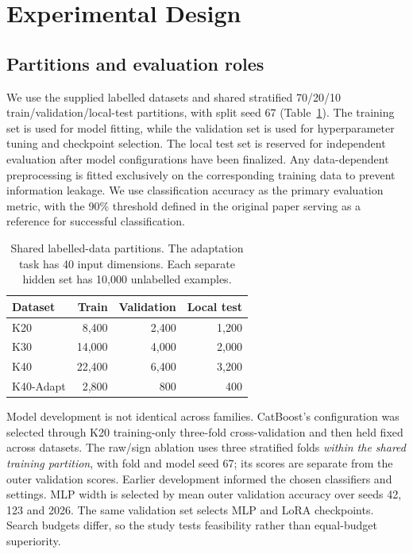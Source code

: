 \documentclass{article}
\begin{document}
\section{Experimental Design}
\subsection{Partitions and evaluation roles}
We use the supplied labelled datasets and shared stratified 70/20/10 train/validation/local-test partitions, with split seed 67 (Table~\ref{tab:data}). The training set is used for model fitting, while the validation set is used for hyperparameter tuning and checkpoint selection. The local test set is reserved for independent evaluation after model configurations have been finalized. Any data-dependent preprocessing is fitted exclusively on the corresponding training data to prevent information leakage. We use classification accuracy as the primary evaluation metric, with the 90\% threshold defined in the original paper serving as a reference for successful classification.



\begin{table}[t]
\centering
\begin{tabular}{lrrr}\toprule
Dataset & Train & Validation & Local test \\\midrule
K20 & 8,400 & 2,400 & 1,200 \\
K30 & 14,000 & 4,000 & 2,000 \\
K40 & 22,400 & 6,400 & 3,200 \\
K40-Adapt & 2,800 & 800 & 400 \\\bottomrule
\end{tabular}
\caption{Shared labelled-data partitions. The adaptation task has 40 input dimensions. Each separate hidden set has 10,000 unlabelled examples.}
\label{tab:data}
\end{table}

Model development is not identical across families. CatBoost's configuration was selected through K20 training-only three-fold cross-validation and then held fixed across datasets. The raw/sign ablation uses three stratified folds \emph{within the shared training partition}, with fold and model seed 67; its scores are separate from the outer validation scores. Earlier development informed the chosen classifiers and settings. MLP width is selected by mean outer validation accuracy over seeds 42, 123 and 2026. The same validation set selects MLP and LoRA checkpoints. Search budgets differ, so the study tests feasibility rather than equal-budget superiority.
\end{document}
